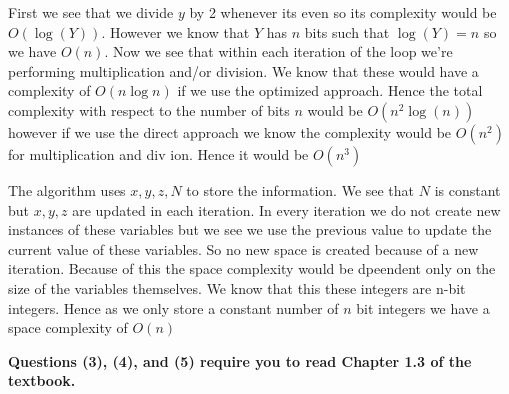 \documentclass[12pt]{article}
\begin{document}
\begin{answer}
    First we see that we divide $y$ by 2 whenever its even so its complexity would be $O(\log(Y))$. However we know that $Y$ has $n$ bits such that $\log(Y) = n$ so we have  $O(n)$. Now we see that within each iteration of the loop we're performing multiplication and/or division. We know that these would have a complexity of $O(n\log n)$ if we use the optimized approach. Hence the total complexity with respect to the number of bits $n$ would be $O(n^2 \log(n))$ however if we use the direct approach we know the complexity would be $O(n^2)$ for multiplication and div ion. Hence it would be $O(n^{3})$

    The algorithm uses $x,y,z,N$ to store the information. We see that $N$ is constant but $x,y,z$ are updated in each iteration. In every iteration we do not create new instances of these variables but we see we use the previous value to update the current value of these variables. So no new space is created because of a new iteration. Because of this the space complexity would be dpeendent only on the size of the variables themselves. We know that this these integers are  n-bit integers. Hence as we only store a constant number of $n$ bit integers we have a space complexity of $O(n)$
\end{answer}


\newpage 

\textbf{Questions (3), (4), and (5) require you to read Chapter 1.3 of the textbook.}
\end{document}
